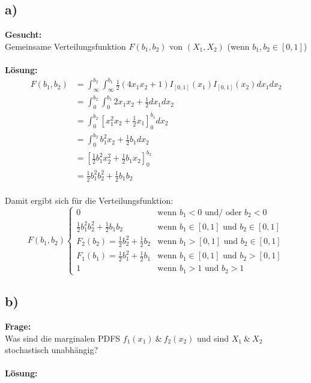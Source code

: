 \documentclass{article}
\begin{document}
\subsection*{a)}
\textbf{Gesucht:}\\

Gemeinsame Verteilungsfunktion $F(b_{1}, b_{2})$ von $(X_{1}, X_{2})$ (wenn $b_{1}, b_{2} \in [0,1]$) \\ \\
\textbf{Lösung:} \\
\begin{align*}
    F(b_{1}, b_{2}) &= \int_{\infty}^{b_{2}}\int_{\infty}^{b_{1}} \frac{1}{2}(4x_{1}x_{2}+ 1)I_{[0,1]}(x_{1})I_{[0,1]}(x_{2}) dx_{1}dx_{2} \\
    &= \int_{0}^{b_{2}}\int_{0}^{b_{1}}2x_{1}x_{2} + \frac{1}{2}dx_{1} dx_{2} \\
    &= \int_{0}^{b_{2}}[x_{1}^{2}x_{2} + \frac{1}{2}x_{1}]^{b_{1}}_{0}dx_{2} \\
    &= \int_{0}^{b_{2}}b_{1}^{2}x_{2} + \frac{1}{2}b_{1} dx_{2} \\
    &= [\frac{1}{2}b_{1}^{2} x_{2}^{2} + \frac{1}{2}b_{1}x_{2}]_{0}^{b_{2}} \\
    &= \frac{1}{2}b_{1}^{2} b_{2}^{2} + \frac{1}{2}b_{1}b_{2}
\end{align*} \\

Damit ergibt sich für die Verteilungsfunktion: 
\[F(b_{1}, b_{2})
\begin{cases}
    0 & \text{wenn } b_{1}< 0\text{ und/ oder } b_{2} < 0 \\
    \frac{1}{2}b_{1}^{2} b_{2}^{2} + \frac{1}{2}b_{1}b_{2} &\text{wenn } b_{1} \in [0, 1] \text{ und } b_{2} \in [0, 1] \\
    F_{2}(b_{2}) = \frac{1}{2} b_{2}^{2} + \frac{1}{2}b_{2} &\text{wenn } b_{1} > [0, 1] \text{ und } b_{2} \in [0, 1] \\
    F_{1}(b_{1}) = \frac{1}{2} b_{1}^{2} + \frac{1}{2}b_{1} &\text{wenn } b_{1} \in [0, 1] \text{ und } b_{2} > [0, 1] \\
    1 &\text{wenn } b_{1} > 1 \text{ und } b_{2} > 1 
\end{cases}\]
\subsection*{b)}
\textbf{Frage:}\\

Was sind die marginalen PDFS $f_{1}(x_{1}) ~\& ~ f_{2}(x_{2})$ und sind $X_{1} ~ \& ~ X_{2}$ stochastisch unabhängig? \\ \\
\textbf{Lösung:}\\
\end{document}

